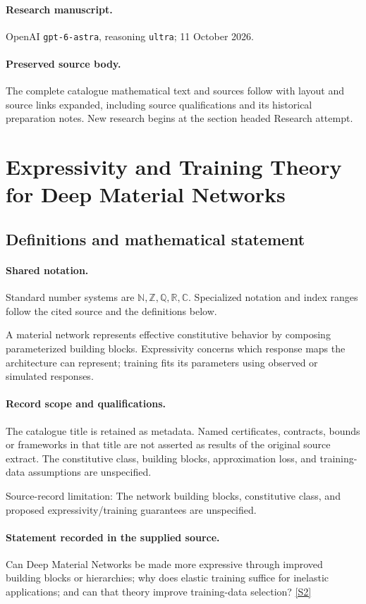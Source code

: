 \documentclass[11pt]{article}
\begin{document}
\paragraph{Research manuscript.} OpenAI \texttt{gpt-6-astra}, reasoning \texttt{ultra}; 11 October 2026.
\paragraph{Preserved source body.} The complete catalogue mathematical text and sources follow with layout and source links expanded, including source qualifications and its historical preparation notes. New research begins at the section headed Research attempt.

\section{Expressivity and Training Theory for Deep Material Networks}\label{statement}

\subsection{Definitions and mathematical statement}

\paragraph{Shared notation.}Standard number systems are $\mathbb N,\mathbb Z,\mathbb Q,\mathbb R,\mathbb C$. Specialized notation and index ranges follow the cited source and the definitions below.


A material network represents effective constitutive behavior by composing parameterized building blocks. Expressivity concerns which response maps the architecture can represent; training fits its parameters using observed or simulated responses.
\paragraph{Record scope and qualifications.}
The catalogue title is retained as metadata. Named certificates, contracts, bounds or frameworks in that title are not asserted as results of the original source extract.
The constitutive class, building blocks, approximation loss, and training-data assumptions are unspecified.

Source-record limitation: The network building blocks, constitutive class, and proposed expressivity/training guarantees are unspecified.
\paragraph{Statement recorded in the supplied source.}
Can Deep Material Networks be made more expressive through improved building blocks or hierarchies; why does elastic training suffice for inelastic applications; and can that theory improve training-data selection? \href{https://doi.org/10.4171/owr/2024/11}{[S2]}
\end{document}
